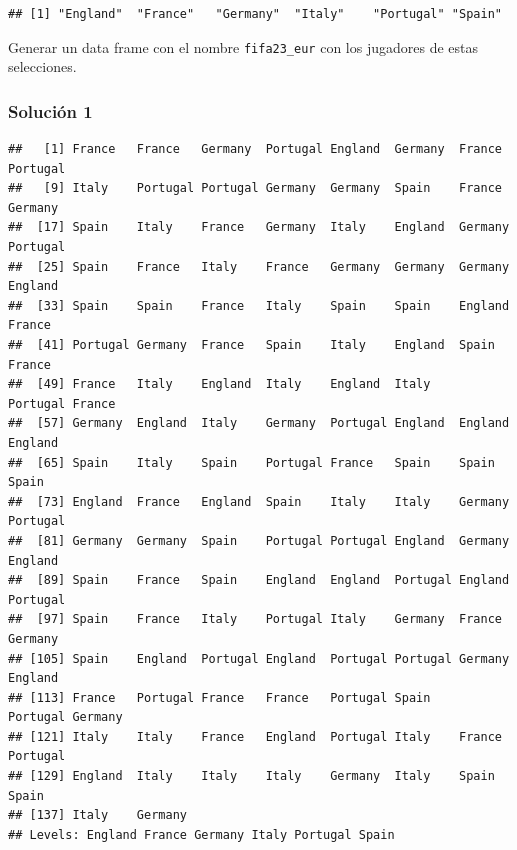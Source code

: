\documentclass[
]{article}
\newenvironment{Shaded}{\begin{snugshade}}{\end{snugshade}}
\newcommand{\FunctionTok}[1]{\textcolor[rgb]{0.00,0.00,0.00}{#1}}
\newcommand{\NormalTok}[1]{#1}
\newcommand{\OtherTok}[1]{\textcolor[rgb]{0.56,0.35,0.01}{#1}}
\newcommand{\SpecialCharTok}[1]{\textcolor[rgb]{0.00,0.00,0.00}{#1}}
\begin{document}
\begin{verbatim}
## [1] "England"  "France"   "Germany"  "Italy"    "Portugal" "Spain"
\end{verbatim}

Generar un data frame con el nombre \texttt{fifa23\_eur} con los
jugadores de estas selecciones.

\hypertarget{soluciuxf3n-1}{%
\subsubsection{Solución 1}\label{soluciuxf3n-1}}

\begin{Shaded}
\end{Shaded}

\begin{verbatim}
##   [1] France   France   Germany  Portugal England  Germany  France   Portugal
##   [9] Italy    Portugal Portugal Germany  Germany  Spain    France   Germany 
##  [17] Spain    Italy    France   Germany  Italy    England  Germany  Portugal
##  [25] Spain    France   Italy    France   Germany  Germany  Germany  England 
##  [33] Spain    Spain    France   Italy    Spain    Spain    England  France  
##  [41] Portugal Germany  France   Spain    Italy    England  Spain    France  
##  [49] France   Italy    England  Italy    England  Italy    Portugal France  
##  [57] Germany  England  Italy    Germany  Portugal England  England  England 
##  [65] Spain    Italy    Spain    Portugal France   Spain    Spain    Spain   
##  [73] England  France   England  Spain    Italy    Italy    Germany  Portugal
##  [81] Germany  Germany  Spain    Portugal Portugal England  Germany  England 
##  [89] Spain    France   Spain    England  England  Portugal England  Portugal
##  [97] Spain    France   Italy    Portugal Italy    Germany  France   Germany 
## [105] Spain    England  Portugal England  Portugal Portugal Germany  England 
## [113] France   Portugal France   France   Portugal Spain    Portugal Germany 
## [121] Italy    Italy    France   England  Portugal Italy    France   Portugal
## [129] England  Italy    Italy    Italy    Germany  Italy    Spain    Spain   
## [137] Italy    Germany 
## Levels: England France Germany Italy Portugal Spain
\end{verbatim}
\end{document}

